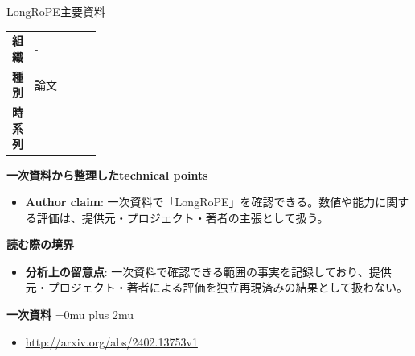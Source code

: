 \begin{technicalnote}{LongRoPE}{主要資料}
\begingroup
\begin{tabularx}{\linewidth}{@{}>{\bfseries}p{0.22\linewidth}X@{}}
組織 & - \\
種別 & 論文 \\
時系列 & — \\
\end{tabularx}
\smallskip
{\bfseries 一次資料から整理したtechnical points}
\begin{itemize}[leftmargin=1.5em,itemsep=0.35em]
\item \textbf{Author claim}: 一次資料で「LongRoPE」を確認できる。数値や能力に関する評価は、提供元・プロジェクト・著者の主張として扱う。
\end{itemize}
\begin{minipage}{\linewidth}
{\bfseries 読む際の境界}
\begin{itemize}[leftmargin=1.5em,itemsep=0.35em]
\item \textbf{分析上の留意点}: 一次資料で確認できる範囲の事実を記録しており、提供元・プロジェクト・著者による評価を独立再現済みの結果として扱わない。
\end{itemize}
\begin{samepage}
{\bfseries 一次資料}
\begingroup\sloppy
\Urlmuskip=0mu plus 2mu\relax
\begin{itemize}[leftmargin=1.5em,itemsep=0.25em]
\item {\scriptsize\url{http://arxiv.org/abs/2402.13753v1}}
\end{itemize}
\endgroup
\end{samepage}
\end{minipage}
\endgroup
\end{technicalnote}
\medskip

